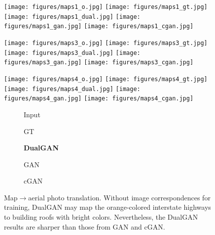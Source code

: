 \begin{figure}
\begin{center}
\texttt{[image: figures/maps1\_o.jpg]}
\texttt{[image: figures/maps1\_gt.jpg]}
\texttt{[image: figures/maps1\_dual.jpg]}
\texttt{[image: figures/maps1\_gan.jpg]}
\texttt{[image: figures/maps1\_cgan.jpg]}



\texttt{[image: figures/maps3\_o.jpg]}
\texttt{[image: figures/maps3\_gt.jpg]}
\texttt{[image: figures/maps3\_dual.jpg]}
\texttt{[image: figures/maps3\_gan.jpg]}
\texttt{[image: figures/maps3\_cgan.jpg]}

\texttt{[image: figures/maps4\_o.jpg]}
\texttt{[image: figures/maps4\_gt.jpg]}
\texttt{[image: figures/maps4\_dual.jpg]}
\texttt{[image: figures/maps4\_gan.jpg]}
\texttt{[image: figures/maps4\_cgan.jpg]}

\begin{subfigure}[]{0.19\linewidth}\caption*{Input}\end{subfigure}
\begin{subfigure}[]{0.19\linewidth}\caption*{GT}\end{subfigure}
\begin{subfigure}[]{0.19\linewidth}\caption*{\textbf{DualGAN}}\end{subfigure}
\begin{subfigure}[]{0.19\linewidth}\caption*{GAN}\end{subfigure}
\begin{subfigure}[]{0.19\linewidth}\caption*{cGAN~\cite{isola2016image}}\end{subfigure}
\caption{Map$\rightarrow$aerial photo translation. Without image correspondences for training, 
DualGAN may map the orange-colored interstate highways to building roofs with bright colors. 
Nevertheless, the DualGAN results are sharper than those from GAN and cGAN.}
\label{fig:maps}
\end{center}
\end{figure}


